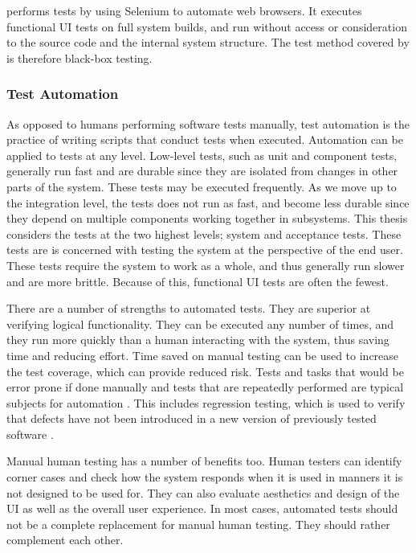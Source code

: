 \toolname \space performs tests by using Selenium to automate web browsers. It executes functional UI tests on full system builds, and run without access or consideration to the source code and the internal system structure. The test method covered by \toolname \space is therefore black-box testing.




\subsubsection{Test Automation}
As opposed to humans performing software tests manually, test automation is the practice of writing scripts that conduct tests when executed. Automation can be applied to tests at any level. Low-level tests, such as unit and component tests, generally run fast and are durable since they are isolated from changes in other parts of the system. These tests may be executed frequently. As we move up to the integration level, the tests does not run as fast, and become less durable since they depend on multiple components working together in subsystems. This thesis considers the tests at the two highest levels; system and acceptance tests. These tests are is concerned with testing the system at the perspective of the end user. These tests require the system to work as a whole, and thus generally run slower and are more brittle. \cite{pluralsight_endtoend} Because of this, functional UI tests are often the fewest.


There are a number of strengths to automated tests. They are superior at verifying logical functionality. They can be executed any number of times, and they run more quickly than a human interacting with the system, thus saving time and reducing effort. Time saved on manual testing can be used to increase the test coverage, which can provide reduced risk. Tests and tasks that would be error prone if done manually and tests that are repeatedly performed are typical subjects for automation \cite{ASTvol3}. This includes regression testing, which is used to verify that defects have not been introduced in a new version of previously tested software \cite{SoftwareTestingFoundations}.

Manual human testing has a number of benefits too. Human testers can identify corner cases and check how the system responds when it is used in manners it is not designed to be used for. They can also evaluate aesthetics and design of the UI as well as the overall user experience. In most cases, automated tests should not be a complete replacement for manual human testing. They should rather complement each other.


